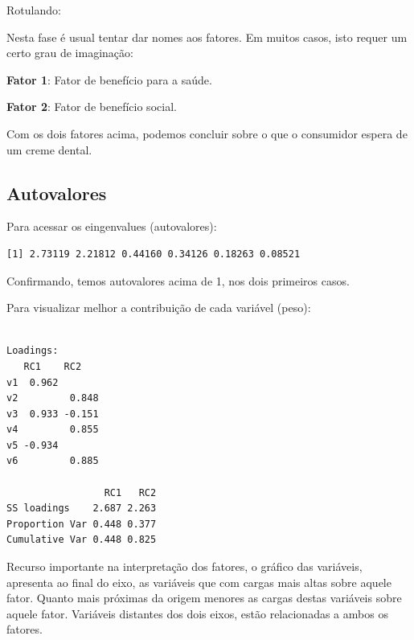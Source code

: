 \documentclass[12pt,brazil,oneside]{book}
\newenvironment{Shaded}{\begin{snugshade}}{\end{snugshade}}
\newcommand{\NormalTok}[1]{#1}
\newcommand{\OperatorTok}[1]{\textcolor[rgb]{0.81,0.36,0.00}{\textbf{#1}}}
\begin{document}
Rotulando:

Nesta fase é usual tentar dar nomes aos fatores. Em muitos casos, isto
requer um certo grau de imaginação:

\textbf{Fator 1}: Fator de benefício para a saúde.

\textbf{Fator 2}: Fator de benefício social.

Com os dois fatores acima, podemos concluir sobre o que o consumidor
espera de um creme dental.

\hypertarget{autovalores-1}{%
\subsection{Autovalores}\label{autovalores-1}}

Para acessar os eingenvalues (autovalores):

\begin{Shaded}
\end{Shaded}

\begin{verbatim}
[1] 2.73119 2.21812 0.44160 0.34126 0.18263 0.08521
\end{verbatim}

Confirmando, temos autovalores acima de 1, nos dois primeiros casos.

Para visualizar melhor a contribuição de cada variável (peso):

\begin{Shaded}
\end{Shaded}

\begin{verbatim}

Loadings:
   RC1    RC2   
v1  0.962       
v2         0.848
v3  0.933 -0.151
v4         0.855
v5 -0.934       
v6         0.885

                 RC1   RC2
SS loadings    2.687 2.263
Proportion Var 0.448 0.377
Cumulative Var 0.448 0.825
\end{verbatim}

Recurso importante na interpretação dos fatores, o gráfico das
variáveis, apresenta ao final do eixo, as variáveis que com cargas mais
altas sobre aquele fator. Quanto mais próximas da origem menores as
cargas destas variáveis sobre aquele fator. Variáveis distantes dos dois
eixos, estão relacionadas a ambos os fatores.
\end{document}
